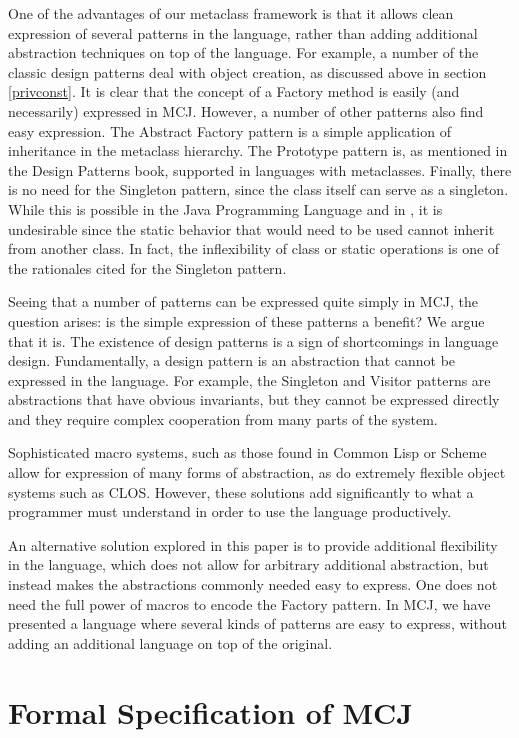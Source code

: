 \documentclass{acmconfbig}
\begin{document}
One of the advantages of our metaclass framework is that it allows
clean expression of several patterns in the language, rather than
adding additional abstraction techniques on top of the language.  For
example, a number of the classic design patterns deal with object
creation, as discussed above in section \ref{privconst}.  It is clear
that the concept of a Factory method is easily (and necessarily)
expressed in MCJ.  However, a number of other patterns also find easy
expression.  The Abstract Factory pattern is a simple application of
inheritance in the metaclass hierarchy.  The Prototype pattern is, as
mentioned in the Design Patterns book, supported in languages with
metaclasses.  Finally, there is no need for the Singleton pattern,
since the class itself can serve as a singleton.  While this is
possible in the Java Programming Language and in \Cpp, it is
undesirable since the static behavior that would need to be used
cannot inherit from another class.  In fact, the inflexibility of
class or static operations is one of the rationales cited for the
Singleton pattern.

Seeing that a number of patterns can be expressed quite simply in MCJ,
the question arises: is the simple expression of these patterns a
benefit?  We argue that it is.  The existence of design patterns is a
sign of shortcomings in language design.  Fundamentally, a design
pattern is an abstraction that cannot be expressed in the language.
For example, the Singleton and Visitor patterns are abstractions that
have obvious invariants, but they cannot be expressed directly and
they require complex cooperation from many parts of the system.

Sophisticated macro systems, such as those found in Common Lisp
\cite{steele-90} or Scheme \cite{SyntaxCase} allow for expression of
many forms of abstraction, as do extremely flexible object systems
such as CLOS. However, these solutions add significantly to what a
programmer must understand in order to use the language productively.

An alternative solution explored in this paper is to provide additional
flexibility in the language, which does not allow for arbitrary
additional abstraction, but instead makes the abstractions commonly
needed easy to express.  One does not need the full power of macros to
encode the Factory pattern.  In MCJ, we have presented a language
where several kinds of patterns are easy to express, without adding an
additional language on top of the original.


\section{Formal Specification of MCJ}
\end{document}

